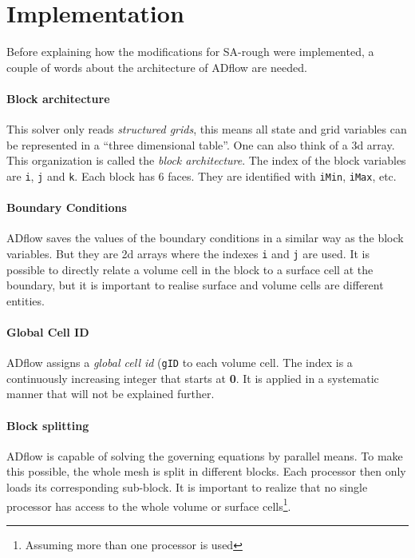 \section{Implementation}
Before explaining how the modifications for SA-rough were implemented, a couple
of words about the architecture of ADflow are needed.

\paragraph{Block architecture}
This solver only reads \textit{structured grids}, this means all state and grid
variables can be represented in a ``three dimensional table''. One can also think
of a 3d array. This organization is called the \textit{block architecture}. The
index of the block variables are \texttt{i}, \texttt{j} and \texttt{k}. Each
block has 6 faces. They are identified with \texttt{iMin}, \texttt{iMax}, etc.

\paragraph{Boundary Conditions}
ADflow saves the values of the boundary conditions in a similar way as the block
variables. But they are 2d arrays where the indexes \texttt{i} and \texttt{j}
are used. It is possible to directly relate a volume cell in the block to a
surface cell at the boundary, but it is important to realise surface and volume
cells are different entities.

\paragraph{Global Cell ID}
ADflow assigns a \textit{global cell id} (\texttt{gID} to each volume cell. The
index is a continuously increasing integer that starts at \textbf{0}. It is
applied in a systematic manner that will not be explained further.

\paragraph{Block splitting}
ADflow is capable of solving the governing equations by parallel means. To make
this possible, the whole mesh is split in different blocks. Each processor then
only loads its corresponding sub-block. It is important to realize that no
single processor has access to the whole volume or surface
cells\footnote{Assuming more than one processor is used}.

